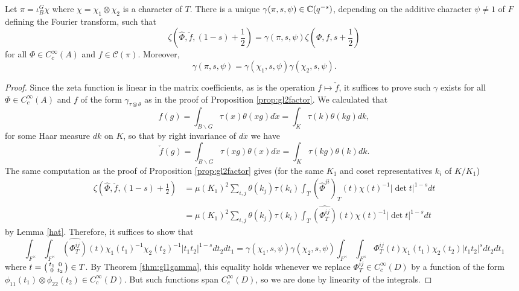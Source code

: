 \begin{prop}\label{prop:gl2gamma}
    Let $\pi = \iota_B^G \chi$ where $\chi=\chi_1\otimes \chi_2$ is a character of $T$. There is a unique $\gamma(\pi,s,\psi) \in \mathbb{C}(q^{-s})$, depending on the additive character $\psi \neq 1$ of $F$ defining the Fourier transform, such that 
    $$\zeta\left(\hat{\Phi},\check{f},(1-s)+\frac{1}{2}\right) = \gamma(\pi,s,\psi) \zeta\left(\Phi,f,s+\frac{1}{2}\right)$$
    for all $\Phi \in C_c^\infty(A)$ and $f \in \mathcal C(\pi)$. Moreover, 
    $$\gamma(\pi,s,\psi) = \gamma(\chi_1,s,\psi)\gamma(\chi_2,s,\psi).$$
\end{prop}
\begin{proof}
    Since the zeta function is linear in the matrix coefficients, as is the operation $f \mapsto \check{f}$, it suffices to prove such $\gamma$ exists for all $\Phi \in C_c^\infty(A)$ and $f$ of the form $\gamma_{\tau \otimes \theta}$ as in the proof of Proposition \ref{prop:gl2factor}. We calculated that 
    $$f(g) = \int_{B \backslash G} \tau(x)\theta(xg) d\dot{x} = \int_K \tau(k)\theta(kg)dk,$$ for some Haar measure $dk$ on $K$, so that by right invariance of $d\dot{x}$ we have 
    $$\check{f}(g) = \int_{B \backslash G}\tau(xg)\theta(x) d\dot{x} = \int_K \tau(kg)\theta(k)dk.$$ The same computation as the proof of Proposition \ref{prop:gl2factor} gives (for the same $K_1$ and coset representatives $k_i$ of $K/K_1$)
    \begin{equation*}
        \begin{split}
            \zeta(\hat{\Phi},\check{f},(1-s)+\frac{1}{2}) &= \mu(K_1)^2 \sum\limits_{i,j} \theta(k_j)\tau(k_i) \int_T (\hat\Phi^{ji})_T(t) \chi(t)^{-1} |\det t|^{1-s} dt \\
            &= \mu(K_1)^2 \sum\limits_{i,j} \theta(k_j)\tau(k_i) \int_T \widehat{(\Phi_T^{ij})}(t) \chi(t)^{-1} |\det t|^{1-s} dt
        \end{split}
    \end{equation*}
    by Lemma \ref{hat}. Therefore, it suffices to show that 
    $$\int_{F^\times}\int_{F^\times} \widehat{(\Phi^{ij}_T)}(t)\chi_1(t_1)^{-1}\chi_2(t_2)^{-1}|t_1t_2|^{1-s} dt_2dt_1 =  \gamma(\chi_1,s,\psi)\gamma(\chi_2,s,\psi) \int_{F^\times} \int_{F^\times}\Phi^{ij}_T(t)\chi_1(t_1)\chi_2(t_2) |t_1t_2|^s dt_2dt_1$$
    where $t = \begin{psmallmatrix}
        t_1 &0\\0&t_2
    \end{psmallmatrix} \in T$. By Theorem \ref{thm:gl1gamma}, this equality holds whenever we replace $\Phi^{ij}_T \in C_c^\infty(D)$ by a function of the form $\phi_{11}(t_1) \otimes \phi_{22}(t_2) \in C_c^\infty(D)$. But such functions span $C_c^\infty(D)$, so we are done by linearity of the integrals.

\end{proof}

